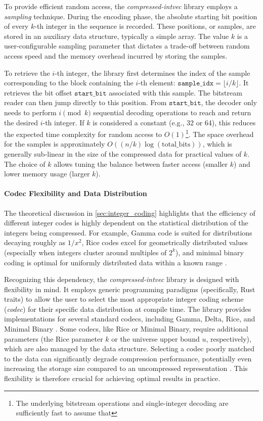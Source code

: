 To provide efficient random access, the \emph{compressed-intvec} library employs a \emph{sampling} technique. During the encoding phase, the absolute starting bit position of every $k$-th integer in the sequence is recorded. These positions, or samples, are stored in an auxiliary data structure, typically a simple array. The value $k$ is a user-configurable sampling parameter that dictates a trade-off between random access speed and the memory overhead incurred by storing the samples.

To retrieve the $i$-th integer, the library first determines the index of the sample corresponding to the block containing the $i$-th element: $\texttt{sample\_idx} = \lfloor i / k \rfloor$. It retrieves the bit offset $\texttt{start\_bit}$ associated with this sample. The bitstream reader can then jump directly to this position. From $\texttt{start\_bit}$, the decoder only needs to perform $i \pmod k$ sequential decoding operations to reach and return the desired $i$-th integer. If $k$ is considered a constant (e.g., 32 or 64), this reduces the expected time complexity for random access to $O(1)$\footnote{The underlying bitstream operations and single-integer decoding are sufficiently fast to assume that}. The space overhead for the samples is approximately $O((n/k) \log(\text{total\_bits}))$, which is generally sub-linear in the size of the compressed data for practical values of $k$. The choice of $k$ allows tuning the balance between faster access (smaller $k$) and lower memory usage (larger $k$).

\paragraph{Codec Flexibility and Data Distribution}
The theoretical discussion in \autoref{sec:integer_coding} highlights that the efficiency of different integer codes is highly dependent on the statistical distribution of the integers being compressed. For example, Gamma code is suited for distributions decaying roughly as $1/x^2$, Rice codes excel for geometrically distributed values (especially when integers cluster around multiples of $2^k$), and minimal binary coding is optimal for uniformly distributed data within a known range \cite{ferragina2023pearls}.

Recognizing this dependency, the \emph{compressed-intvec} library is designed with flexibility in mind. It employs generic programming paradigms (specifically, Rust traits) to allow the user to select the most appropriate integer coding scheme (\emph{codec}) for their specific data distribution at compile time. The library provides implementations for several standard codecs, including Gamma, Delta, Rice, and Minimal Binary \cite{compressed-intvec}. Some codecs, like Rice or Minimal Binary, require additional parameters (the Rice parameter $k$ or the universe upper bound $u$, respectively), which are also managed by the data structure. Selecting a codec poorly matched to the data can significantly degrade compression performance, potentially even increasing the storage size compared to an uncompressed representation \cite{compressed-intvec}. This flexibility is therefore crucial for achieving optimal results in practice.
